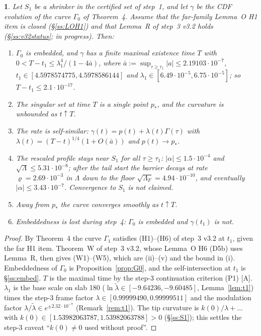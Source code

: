 \documentclass[11pt]{article}
\newtheorem*{namedthm*}{\thisthmname}
\newcommand{\thisthmname}{}
\newenvironment{named}[1]{\renewcommand{\thisthmname}{#1}\begin{namedthm*}}{\end{namedthm*}}
\theoremstyle{definition}
\theoremstyle{remark}
\newcommand{\tA}{\textnormal{\textsc{[A]}}}
\newcommand{\abs}[1]{\lvert #1\rvert}
\newcommand{\Lam}{\Lambda}
\begin{document}
\begin{named}{Main Theorem (conditional)}
Let $S_1$ be a shrinker in the certified set of step~1, and let $\gamma$ be the CDF evolution of the curve $\Gamma_0$ of Theorem~4. Assume that the far-family Lemma~O H1 item is closed (\S\ref{ss:LOH1}) and that Lemma~R of step~3 v3.2 holds (\S\ref{ss:v32status}; in progress). Then:
\begin{enumerate}[label=(\roman*)]
\item $\Gamma_0$ is embedded, and $\gamma$ has a finite maximal existence time $T$ with $0<T-t_1\le\lambda_1^4/(1-4\bar a)$, where $\bar a:=\sup_{\tau\ge\tau_1}\abs a\le2.19103\cdot10^{-7}$, $t_1\in[4.5978574775,4.5978586144]$ and $\lambda_1\in[6.49\cdot10^{-5},6.75\cdot10^{-5}]$; so $T-t_1\le2.1\cdot10^{-17}$.
\item The singular set at time $T$ is a single point $p_*$, and the curvature is unbounded as $t\uparrow T$.
\item The rate is self-similar: $\gamma(t)=p(t)+\lambda(t)\Gamma(\tau)$ with $\lambda(t)=(T-t)^{1/4}(1+O(\bar a))$ and $p(t)\to p_*$.
\item The rescaled profile stays near $S_1$ for all $\tau\ge\tau_1$: $\abs\alpha\le1.5\cdot10^{-4}$ and $\sqrt\Lam\le5.31\cdot10^{-8}$; after the tail start the barrier decays at rate $\varrho=2.69\cdot10^{-3}$ in $\Lam$ down to the floor $\sqrt{\Lam_F}=4.94\cdot10^{-10}$, and eventually $\abs\alpha\le3.43\cdot10^{-7}$. Convergence to $S_1$ is not claimed.
\item Away from $p_*$ the curve converges smoothly as $t\uparrow T$.
\item Embeddedness is lost during step~4: $\Gamma_0$ is embedded and $\gamma(t_1)$ is not.
\end{enumerate}
\end{named}
\begin{proof}
By Theorem~4 the curve $\Gamma_1$ satisfies (H1)--(H6) of step~3 v3.2 at $t_1$, given the far H1 item. Theorem~W of step~3 v3.2, whose Lemma~O H6 (D5b) uses Lemma~R, then gives (W1)--(W5), which are (ii)--(v) and the bound in (i). Embeddedness of $\Gamma_0$ is Proposition~\ref{prop:G0}, and the self-intersection at $t_1$ is \S\ref{ss:embed}. $T$ is the maximal time by the step-3 continuation criterion (P1) \tA. $\lambda_1$ is the base scale on slab 180 ($\ln\tilde\lambda\in[-9.64236,-9.60485]$, Lemma~\ref{lem:t1}) times the step-3 frame factor $\lambda\in[0.99999490,0.99999511]$ and the modulation factor $\lambda/\tilde\lambda\in e^{\pm2.32\cdot10^{-7}}$ (Remark~\ref{rem:t1}). The tip curvature is $k(0)/\lambda+\dots$ with $k(0)\in[1.53982063787,1.53982063788]>0$ (\S\ref{ss:S1}); this settles the step-3 caveat ``$k(0)\neq0$ used without proof''.
\end{proof}
\end{document}
